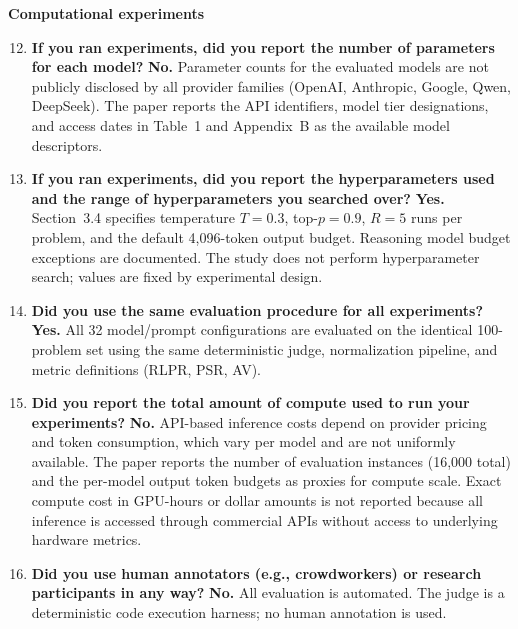 \documentclass[11pt,a4paper]{article}
\begin{document}
\noindent\textbf{Computational experiments}

\begin{enumerate}
\setcounter{enumi}{11}

\item \textbf{If you ran experiments, did you report the number of
  parameters for each model?}
  \textbf{No.} Parameter counts for the evaluated models are not
  publicly disclosed by all provider families (OpenAI, Anthropic, Google,
  Qwen, DeepSeek). The paper reports the API identifiers, model tier
  designations, and access dates in Table~1 and Appendix~B as the
  available model descriptors.

\item \textbf{If you ran experiments, did you report the hyperparameters
  used and the range of hyperparameters you searched over?}
  \textbf{Yes.} Section~3.4 specifies temperature $T=0.3$, top-$p=0.9$,
  $R=5$ runs per problem, and the default 4{,}096-token output budget.
  Reasoning model budget exceptions are documented. The study does not
  perform hyperparameter search; values are fixed by experimental design.

\item \textbf{Did you use the same evaluation procedure for all
  experiments?}
  \textbf{Yes.} All 32 model/prompt configurations are evaluated on
  the identical 100-problem set using the same deterministic judge,
  normalization pipeline, and metric definitions (RLPR, PSR, AV).

\item \textbf{Did you report the total amount of compute used to run
  your experiments?}
  \textbf{No.} API-based inference costs depend on provider pricing and
  token consumption, which vary per model and are not uniformly
  available. The paper reports the number of evaluation instances
  (16{,}000 total) and the per-model output token budgets as proxies
  for compute scale. Exact compute cost in GPU-hours or dollar amounts
  is not reported because all inference is accessed through commercial
  APIs without access to underlying hardware metrics.

\item \textbf{Did you use human annotators (e.g., crowdworkers) or
  research participants in any way?}
  \textbf{No.} All evaluation is automated. The judge is a deterministic
  code execution harness; no human annotation is used.


\end{enumerate}
\end{document}
